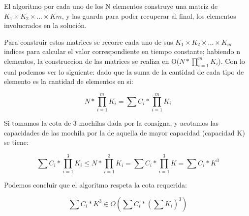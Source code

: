 El algoritmo por cada uno de los N elementos construye una matriz de $K_{1} \times K_{2} \times...\times K{m}$, y las guarda para poder recuperar al final, los elementos involucrados en la solución.

Para construir estas matrices se recorre cada uno de sus $K_{1} \times K_{2} \times...\times K_{m}$ indices para calcular el valor correspondiente en tiempo constante; habiendo n elementos, la construccion de las matrices se realiza en O($N \ast \prod_{i=1}^{m}K_{i}$). Con lo cual podemos ver lo siguiente: dado que la suma de la cantidad de cada tipo de elemento es la cantidad de elementos en si:

\[
N \ast \prod_{i=1}^{m}K_{i} = \sum C_{i} \ast \prod_{i=1}^{m}K_{i}
\]

Si tomamos la cota de 3 mochilas dada por la consigna, y acotamos las capacidades de las mochila por la de aquella de mayor capacidad (capacidad K) se tiene:

\[
\sum C_{i} \ast \prod_{i=1}^{3} K_{i} \leq
N \ast \prod_{i=1}^{3}K_{i} = \sum C_{i} \ast \prod_{i=1}^{3}K = \sum C_{i} \ast  K^{3}
\]  

Podemos concluir que el algoritmo respeta la cota requerida:


\[
\sum C_{i} \ast  K^{3} \in O( \sum C_{i} \ast (\sum K_{i})^3)
\]